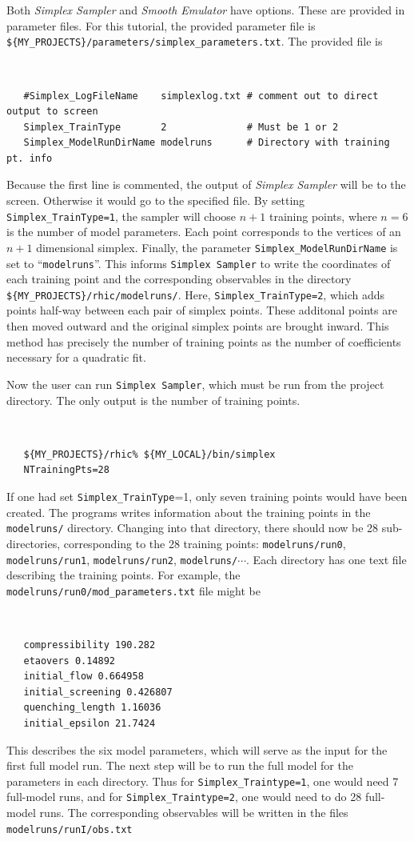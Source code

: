 \documentclass[UserManual.tex]{subfiles}
\begin{document}
Both {\it Simplex Sampler} and {\it Smooth Emulator} have options. These are provided in parameter files. For this tutorial, the provided parameter file is {\tt \$\{MY\_PROJECTS\}/parameters/simplex\_parameters.txt}. The provided file is
{\tt
\begin{verbatim}
   #Simplex_LogFileName    simplexlog.txt # comment out to direct output to screen
   Simplex_TrainType       2              # Must be 1 or 2             
   Simplex_ModelRunDirName modelruns      # Directory with training pt. info
\end{verbatim}
}
Because the first line is commented, the output of {\it Simplex Sampler} will be to the screen. Otherwise it would go to the specified file. By setting {\tt Simplex\_TrainType=1}, the sampler will choose $n+1$ training points, where $n=6$ is the number of model parameters. Each point corresponds to the vertices of an $n+1$ dimensional simplex.  Finally, the parameter {\tt Simplex\_ModelRunDirName} is set to ``{\tt modelruns}''. This informs {\tt Simplex Sampler} to write the coordinates of each training point and the corresponding observables in the directory {\tt \$\{MY\_PROJECTS\}/rhic/modelruns/}. Here, {\tt Simplex\_TrainType=2}, which adds points half-way between each pair of simplex points. These additonal points are then moved outward and the original simplex points are brought inward. This method has precisely the number of training points as the number of coefficients necessary for a quadratic fit. 

Now the user can run {\tt Simplex Sampler}, which must be run from the project directory. The only output is the number of training points.
 {\tt
\begin{verbatim}
   ${MY_PROJECTS}/rhic% ${MY_LOCAL}/bin/simplex
   NTrainingPts=28
\end{verbatim}
}
If one had set {\tt Simplex\_TrainType}=1, only seven training points would have been created. The programs writes information about the training points in the {\tt modelruns/} directory. Changing into that directory, there should now be 28 sub-directories, corresponding to the 28 training points: {\tt modelruns/run0}, {\tt modelruns/run1}, {\tt modelruns/run2}, {\tt modelruns/}$\cdots$. Each directory has one text file describing the training points. For example, the {\tt modelruns/run0/mod\_parameters.txt} file might be 
{\tt
\begin{verbatim}
   compressibility 190.282
   etaovers 0.14892
   initial_flow 0.664958
   initial_screening 0.426807
   quenching_length 1.16036
   initial_epsilon 21.7424
\end{verbatim}
}
This describes the six model parameters, which will serve as the input for the first full model run.  The next step will be to run the full model for the parameters in each directory. Thus for {\tt Simplex\_Traintype=1}, one would need 7 full-model runs, and for {\tt Simplex\_Traintype=2}, one would need to do 28 full-model runs. The corresponding observables will be written in the files {\tt modelruns/runI/obs.txt}
\end{document}
